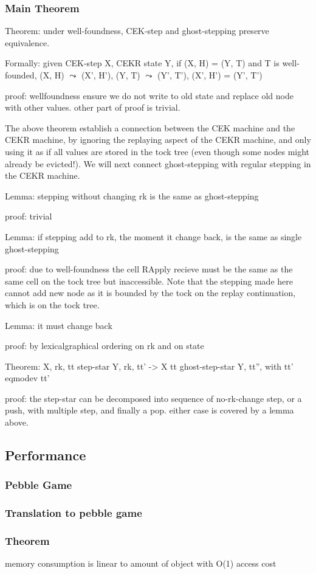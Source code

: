 \subsubsection{Main Theorem}
Theorem: under well-foundness, CEK-step and ghost-stepping preserve equivalence.

Formally: given CEK-step X, CEKR state Y, if (X, H) = (Y, T) and T is well-founded, (X, H) $\leadsto$ (X', H'), (Y, T) $\leadsto$ (Y', T'), (X', H') = (Y', T')

proof: wellfoundness ensure we do not write to old state and replace old node with other values. other part of proof is trivial.

The above theorem establish a connection between the CEK machine and the CEKR machine, by ignoring the replaying aspect of the CEKR machine, and only using it as if all values are stored in the tock tree (even though some nodes might already be evicted!). We will next connect ghost-stepping with regular stepping in the CEKR machine.

Lemma: stepping without changing rk is the same as ghost-stepping

proof: trivial

Lemma: if stepping add to rk, the moment it change back, is the same as single ghost-stepping

proof: due to well-foundness the cell RApply recieve must be the same as the same cell on the tock tree but inaccessible. Note that the stepping made here cannot add new node as it is bounded by the tock on the replay continuation, which is on the tock tree.

Lemma: it must change back

proof: by lexicalgraphical ordering on rk and on state

Theorem: X, rk, tt step-star Y, rk, tt' -> X tt ghost-step-star Y, tt'', with tt' eqmodev tt'

proof: the step-star can be decomposed into sequence of no-rk-change step, or a push, with multiple step, and finally a pop. either case is covered by a lemma above.

\subsection{Performance}
\subsubsection{Pebble Game}
\subsubsection{Translation to pebble game}
\subsubsection{Theorem}
memory consumption is linear to amount of object with O(1) access cost
